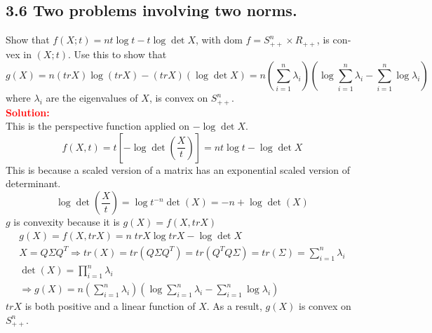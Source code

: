 \begin{latin}

\section{3.6 Two problems involving two norms.}

Show that $ f(X; t) = nt \log t - t \log \det X $, with dom $ f = S^{n}_{++} \times R_{++} $, is convex in $ (X; t) $. Use this to show that
\begin{equation*}
	g(X) = n(tr X) \log(tr X) - (tr X)(\log \det X) = n (\sum_{i=1}^{n} 
	\lambda_i) (\log \sum_{i=1}^{n} \lambda_i - \sum_{i=1}^{n} \log \lambda_i)
\end{equation*}
where $ \lambda_i $ are the eigenvalues of $ X $, is convex on $ S^{n}_{++} $.
\\
\textcolor{red}{\textbf{Solution:}}
\\
This is the perspective function applied on $ - \log \det X $. 
\begin{equation*}
	f(X, t) = t [- \log \det(\frac{X}{t})] = nt \log t - \log \det X
\end{equation*}
This is because a scaled version of a matrix has an exponential scaled version of determinant.
\begin{equation*}
	\log \det(\frac{X}{t})= \log t^{-n} \det(X) = -n + \log \det(X)
\end{equation*}
$ g $ is convexity because it is $ g(X) = f(X, tr X) $
\begin{gather*}
	 g(X) = f(X, tr X) = n \; trX \log tr X - \log \det X
	 \\
	 X = Q \Sigma Q^{T} \Rightarrow tr(X) = tr(Q \Sigma Q^{T}) = tr(Q^{T} Q \Sigma) = tr(\Sigma) = \sum_{i=1}^{n} \lambda_i
	 \\
	 \det(X) = \prod_{i=1}^{n} \lambda_i
	 \\
	 \Rightarrow g(X) = n (\sum_{i=1}^{n} 
	 \lambda_i) (\log \sum_{i=1}^{n} \lambda_i - \sum_{i=1}^{n} \log \lambda_i)
\end{gather*}
	  $ tr X $ is both positive and a linear function of $ X $. As a result, $ g(X) $ is convex on $ S^{n}_{++} $.
\end{latin}
